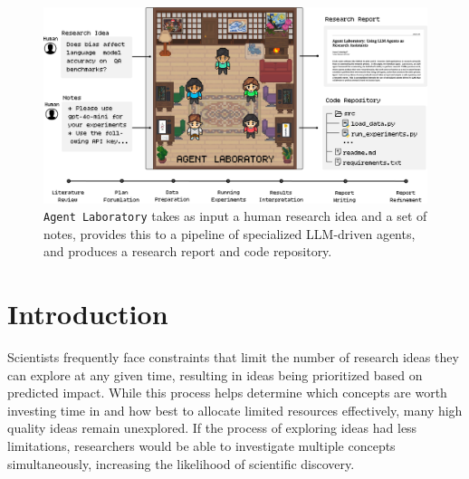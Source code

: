 \documentclass[11pt, a4paper]{gdm_format}
\begin{document}
\begin{figure}[ht!]
    \centering
    \includegraphics[width=0.93\linewidth]{images/jpgs/Agent-Laboratory.jpg}
    \caption{ \texttt{Agent Laboratory} takes as input a human research idea and a set of notes, provides this to a pipeline of specialized LLM-driven agents, and produces a research report and code repository.}
    \label{fig:AgentLab}
\end{figure}



\section{Introduction}

Scientists frequently face constraints that limit the number of research ideas they can explore at any given time, resulting in ideas being prioritized based on predicted impact. While this process helps determine which concepts are worth investing time in and how best to allocate limited resources effectively, many high quality ideas remain unexplored. If the process of exploring ideas had less limitations, researchers would be able to investigate multiple concepts simultaneously, increasing the likelihood of scientific discovery.
\end{document}

